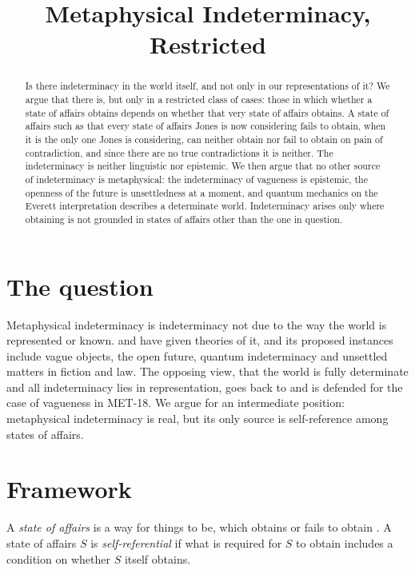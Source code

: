 \documentclass{situationist-preprint}
\title{Metaphysical Indeterminacy, Restricted}
\begin{document}
\maketitle

\begin{abstract}
Is there indeterminacy in the world itself, and not only in our representations of it? We argue that there is, but only in a restricted class of cases: those in which whether a state of affairs obtains depends on whether that very state of affairs obtains. A state of affairs such as that every state of affairs Jones is now considering fails to obtain, when it is the only one Jones is considering, can neither obtain nor fail to obtain on pain of contradiction, and since there are no true contradictions it is neither. The indeterminacy is neither linguistic nor epistemic. We then argue that no other source of indeterminacy is metaphysical: the indeterminacy of vagueness is epistemic, the openness of the future is unsettledness at a moment, and quantum mechanics on the Everett interpretation describes a determinate world. Indeterminacy arises only where obtaining is not grounded in states of affairs other than the one in question.
\end{abstract}

\section{The question}

Metaphysical indeterminacy is indeterminacy not due to the way the world is represented or known. \citet{BarnesWilliams2011} and \citet{Wilson2013} have given theories of it, and its proposed instances include vague objects, the open future, quantum indeterminacy and unsettled matters in fiction and law. The opposing view, that the world is fully determinate and all indeterminacy lies in representation, goes back to \citet{Russell1923} and is defended for the case of vagueness in MET-18. We argue for an intermediate position: metaphysical indeterminacy is real, but its only source is self-reference among states of affairs.

\section{Framework}

\begin{definition}\label{d:soa}
A \emph{state of affairs} is a way for things to be, which obtains or fails to obtain \citep{Armstrong1997}. A state of affairs $S$ is \emph{self-referential} if what is required for $S$ to obtain includes a condition on whether $S$ itself obtains.
\end{definition}
\end{document}
